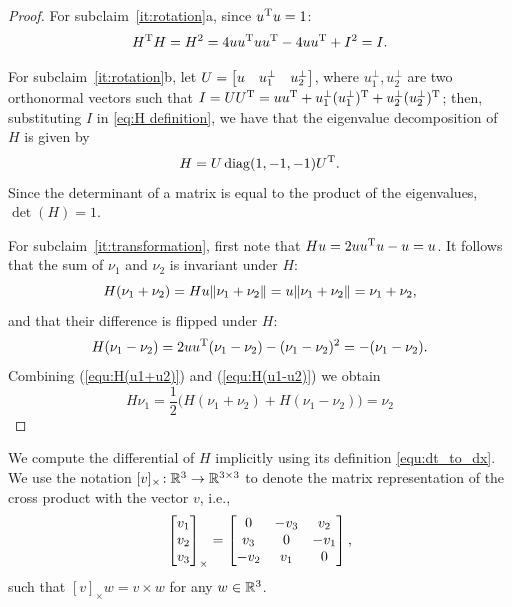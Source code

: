 \documentclass[10pt,twocolumn,twoside]{IEEEtran}
\newcommand{\news}{\color{blue}}
\begin{document}
\begin{proof}
 {\news For subclaim~\ref{it:rotation}a,  since $u^\mathrm{T} u=1$:
  \begin{equation}
    H^\mathrm{T} H=H^2=4uu^\mathrm{T} u u^\mathrm{T} - 4uu^\mathrm{T} +I^2=I.
  \end{equation}}

  For subclaim~\ref{it:rotation}b, let $U=\begin{bmatrix}u & u^\bot_{1} & u^\bot_{2}\end{bmatrix}$, where $u^\bot_{1},u^\bot_{2}$ are two orthonormal vectors such that $I=UU^\mathrm{T}=uu^\mathrm{T} + u^\bot_{1}(u^\bot_{1})^\mathrm{T}+u^\bot_{2}(u^\bot_{2})^\mathrm{T}$; then, substituting $I$ in \eqref{eq:H definition}, we have that the eigenvalue decomposition of $H$ is given by
  \begin{equation}
    H=U\operatorname{diag}(1,-1,-1) U^\mathrm{T}.
  \end{equation}
  Since the determinant of a matrix is equal to the product of the eigenvalues, $\det(H)=1$.

  For subclaim~\ref{it:transformation}, first note that $Hu=2uu^\mathrm{T} u - u=u$.
  It follows that the sum of $\nu_1$ and $\nu_2$ is invariant under $H$:
  \begin{equation}\label{equ:H(u1+u2)}
    H(\nu_1+\nu_2)=H u \lVert\nu_1+\nu_2\rVert
    = u\lVert\nu_1+\nu_2\rVert =\nu_1+\nu_2,
  \end{equation}
  and that their difference is flipped under $H$:
  \begin{equation}\label{equ:H(u1-u2)}
    H(\nu_1-\nu_2) = 2uu^\mathrm{T} (\nu_1-\nu_2) - (\nu_1-\nu_2)^2 = -(\nu_1-\nu_2).
  \end{equation}
  Combining (\ref{equ:H(u1+u2)}) and (\ref{equ:H(u1-u2)}) we obtain
  \begin{equation}
    H\nu_1 = \frac{1}{2}\bigl(H(\nu_1+\nu_2)+H(\nu_1-\nu_2)\bigr)
    = \nu_2
  \end{equation}
\end{proof}
We compute the differential of $H$ implicitly using its definition \eqref{equ:dt_to_dx}. We use the notation $[v]_{\times}\!:\mathbb{R}^{3}{}\to\mathbb{R}^{3\times 3}{}$ to denote the matrix representation of the cross product with the vector $v$, i.e.,
\begin{equation}
  \begin{bmatrix}v_1\\v_2\\v_3\end{bmatrix}_\times= \begin{bmatrix}0 & -v_3 &v_2\\v_3 & 0 & -v_1\\-v_2 & v_1 & 0\end{bmatrix},
\end{equation}
such that $[v]_\times w=v\times w$ for any $w\in\mathbb{R}^{3}{}$. 
\end{document}
